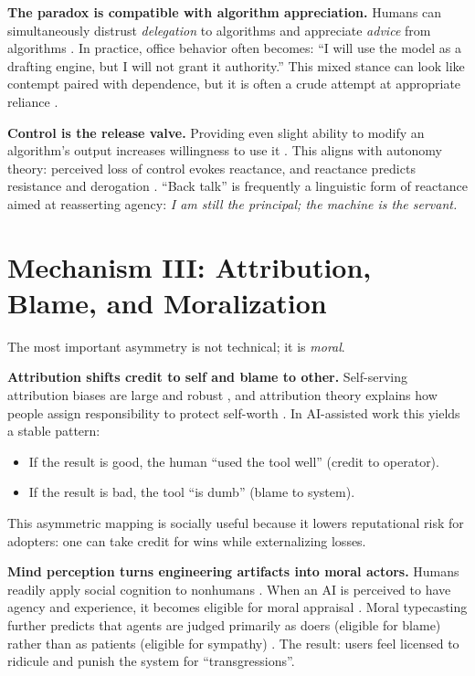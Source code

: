 \documentclass[11pt, a4paper, twocolumn]{article} %
\begin{document}
\textbf{The paradox is compatible with algorithm appreciation.} Humans can simultaneously distrust \emph{delegation} to algorithms and appreciate \emph{advice} from algorithms \citep{LoggMinsonMoore2019Appreciation}. In practice, office behavior often becomes: ``I will use the model as a drafting engine, but I will not grant it authority.'' This mixed stance can look like contempt paired with dependence, but it is often a crude attempt at appropriate reliance \citep{LeeSee2004TrustAutomation}.

\textbf{Control is the release valve.} Providing even slight ability to modify an algorithm's output increases willingness to use it \citep{DietvorstSimmonsMassey2018Overcoming}. This aligns with autonomy theory: perceived loss of control evokes reactance, and reactance predicts resistance and derogation \citep{DeciRyan2000WhatWhy,Rains2013ReactanceMeta,DillardShen2005Reactance}. ``Back talk'' is frequently a linguistic form of reactance aimed at reasserting agency: \emph{I am still the principal; the machine is the servant.}

\section*{Mechanism III: Attribution, Blame, and Moralization}

The most important asymmetry is not technical; it is \emph{moral}.

\textbf{Attribution shifts credit to self and blame to other.} Self-serving attribution biases are large and robust \citep{MezulisEtAl2004SelfServing}, and attribution theory explains how people assign responsibility to protect self-worth \citep{Weiner1985Attribution}. In AI-assisted work this yields a stable pattern:
\begin{itemize}[leftmargin=*]
  \item If the result is good, the human ``used the tool well'' (credit to operator).
  \item If the result is bad, the tool ``is dumb'' (blame to system).
\end{itemize}
This asymmetric mapping is socially useful because it lowers reputational risk for adopters: one can take credit for wins while externalizing losses.

\textbf{Mind perception turns engineering artifacts into moral actors.} Humans readily apply social cognition to nonhumans \citep{NassMoon2000Mindlessness,WaytzEpleyCacioppo2010Unbound}. When an AI is perceived to have agency and experience, it becomes eligible for moral appraisal \citep{GrayGrayWegner2007MindPerception}. Moral typecasting further predicts that agents are judged primarily as doers (eligible for blame) rather than as patients (eligible for sympathy) \citep{GrayWegner2009Typecasting}. The result: users feel licensed to ridicule and punish the system for ``transgressions''.
\end{document}
